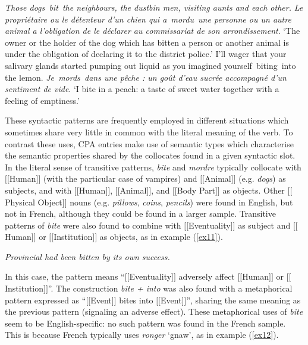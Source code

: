 \documentclass[output=paper]{langsci/langscibook}
\begin{document}
\ea
\label{ex7}
\textit{Those dogs~bit~the neighbours, the dustbin men, visiting aunts and
each other.}
\ex \label{ex8}
\textit{Le propriétaire ou le détenteur d'un chien qui a~mordu~une personne
ou un autre animal a l'obligation de le déclarer au commissariat de son
arrondissement}.
\glt `The owner or the holder of the dog which has bitten a
person or another animal is under the obligation of declaring it to the
district police.'
\ex \label{ex9}
I'll wager that your salivary glands started pumping out liquid as
you imagined yourself~biting~into the lemon.
\ex \label{ex10}
\textit{Je~mords~dans une pêche : un goût d'eau sucrée accompagné d'un
sentiment de vide}.
\glt `I bite in a peach: a taste of sweet water together with a
feeling of emptiness.'
\z





These syntactic patterns are frequently employed in different situations
which sometimes share very little in common with the literal meaning of
the verb. To contrast these uses, CPA entries make use of semantic
types which characterise the semantic properties shared by the
collocates found in a given syntactic slot. In the literal sense of
transitive patterns, \textit{bite} and \textit{mordre} typically collocate with
$[$$[$Human$]$$]$ (with the particular case of vampires) and $[$$[$Animal$]$$]$ (e.g.
\textit{dogs}) as subjects, and with $[$$[$Human$]$$]$, $[$$[$Animal$]$$]$, and $[$$[$Body Part$]$$]$
as objects. Other $[$$[$Physical Object$]$$]$ nouns (e.g. \textit{pillows}, \textit{coins},
\textit{pencils}) were found in English, but not in French, although they
could be found in a larger sample. Transitive patterns of \textit{bite}  were
also found to combine with $[$$[$Eventuality$]$$]$ as subject and $[$$[$Human$]$$]$ or
$[$$[$Institution$]$$]$ as objects, as in example (\ref{ex11}).



\begin{exe}
\ex  \label{ex11} 
\textit{Provincial had been bitten by its own success.}
\end{exe}





In this case, the pattern means “$[$$[$Eventuality$]$$]$ adversely affect
$[$$[$Human$]$$]$ or $[$$[$Institution$]$$]$”. The construction \textit{bite + into} was also
found with a metaphorical pattern expressed as “$[$$[$Event$]$$]$ bites into
$[$$[$Event$]$$]$”, sharing the same meaning as the previous pattern (signaling
an adverse effect). These metaphorical uses of  \textit{bite} seem to be
English-specific: no such pattern was found in the French sample. This
is because French typically uses \textit{ronger} ‘gnaw’, as in example (\ref{ex12}).
\end{document}
